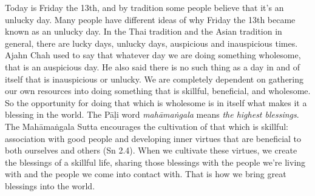 Today is Friday the 13th, and by tradition some people believe that 
it's an unlucky day. Many people have different ideas of why Friday the 
13th became known as an unlucky day. In the Thai tradition and the 
Asian tradition in general, there are lucky days, unlucky days, 
auspicious and inauspicious times. Ajahn Chah used to say that whatever 
day we are doing something wholesome, that is an auspicious day. He 
also said there is no such thing as a day in and of itself that is 
inauspicious or unlucky. We are completely dependent on gathering our 
own resources into doing something that is skillful, beneficial, and 
wholesome. So the opportunity for doing that which is wholesome is in 
itself what makes it a blessing in the world. The Pāḷi word 
\emph{mahāmaṅgala} means \emph{the highest blessings}. The 
Mahāmaṅgala Sutta encourages the cultivation of that which is 
skillful: association with good people and developing inner virtues 
that are beneficial to both ourselves and others (Sn 2.4). When we 
cultivate these virtues, we create the blessings of a skillful life, 
sharing those blessings with the people we're living with and the 
people we come into contact with. That is how we bring great blessings 
into the world.

